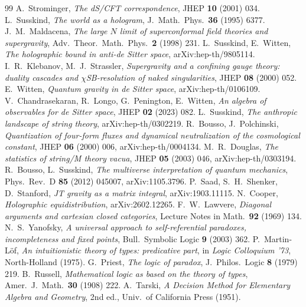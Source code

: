 \begin{thebibliography}{99}
 A.~Strominger, \emph{The dS/CFT correspondence}, JHEP \textbf{10} (2001) 034.
 L.~Susskind, \emph{The world as a hologram}, J.~Math.~Phys.\ \textbf{36} (1995) 6377.
 J.~M.~Maldacena, \emph{The large $N$ limit of superconformal field theories and supergravity}, Adv.\ Theor.\ Math.\ Phys.\ \textbf{2} (1998) 231.
 L.~Susskind, E.~Witten, \emph{The holographic bound in anti-de Sitter space}, arXiv:hep-th/9805114.
 I.~R.~Klebanov, M.~J.~Strassler, \emph{Supergravity and a confining gauge theory: duality cascades and $\chi$SB-resolution of naked singularities}, JHEP \textbf{08} (2000) 052.
 E.~Witten, \emph{Quantum gravity in de Sitter space}, arXiv:hep-th/0106109.
 V.~Chandrasekaran, R.~Longo, G.~Penington, E.~Witten, \emph{An algebra of observables for de Sitter space}, JHEP \textbf{02} (2023) 082.
 L.~Susskind, \emph{The anthropic landscape of string theory}, arXiv:hep-th/0302219.
 R.~Bousso, J.~Polchinski, \emph{Quantization of four-form fluxes and dynamical neutralization of the cosmological constant}, JHEP \textbf{06} (2000) 006, arXiv:hep-th/0004134.
 M.~R.~Douglas, \emph{The statistics of string/M theory vacua}, JHEP \textbf{05} (2003) 046, arXiv:hep-th/0303194.
 R.~Bousso, L.~Susskind, \emph{The multiverse interpretation of quantum mechanics}, Phys.\ Rev.\ D \textbf{85} (2012) 045007, arXiv:1105.3796.
 P.~Saad, S.~H.~Shenker, D.~Stanford, \emph{JT gravity as a matrix integral}, arXiv:1903.11115.
 N.~Cooper, \emph{Holographic equidistribution}, arXiv:2602.12265.
 F.~W.~Lawvere, \emph{Diagonal arguments and cartesian closed categories}, Lecture Notes in Math.\ \textbf{92} (1969) 134.
 N.~S.~Yanofsky, \emph{A universal approach to self-referential paradoxes, incompleteness and fixed points}, Bull.\ Symbolic Logic \textbf{9} (2003) 362.
 P.~Martin-L\"of, \emph{An intuitionistic theory of types: predicative part}, in \emph{Logic Colloquium '73}, North-Holland (1975).
 G.~Priest, \emph{The logic of paradox}, J.~Philos.\ Logic \textbf{8} (1979) 219.
 B.~Russell, \emph{Mathematical logic as based on the theory of types}, Amer.\ J.\ Math.\ \textbf{30} (1908) 222.
 A.~Tarski, \emph{A Decision Method for Elementary Algebra and Geometry}, 2nd ed., Univ.\ of California Press (1951).

\end{thebibliography}
